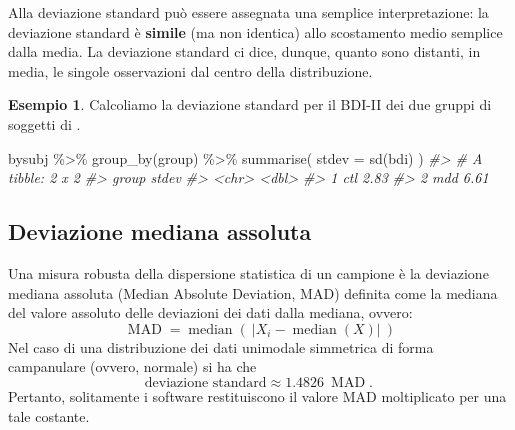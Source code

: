\documentclass[
  11pt,
  italian,
  a4paper,
  extrafontsizes,onecolumn,openright
  ]{memoir}
\newenvironment{Shaded}{\begin{snugshade}}{\end{snugshade}}
\newcommand{\AttributeTok}[1]{\textcolor[rgb]{0.77,0.63,0.00}{#1}}
\newcommand{\CommentTok}[1]{\textcolor[rgb]{0.56,0.35,0.01}{\textit{#1}}}
\newcommand{\FunctionTok}[1]{\textcolor[rgb]{0.00,0.00,0.00}{#1}}
\newcommand{\NormalTok}[1]{#1}
\newcommand{\SpecialCharTok}[1]{\textcolor[rgb]{0.00,0.00,0.00}{#1}}
\theoremstyle{definition}
\theoremstyle{definition}
\newtheorem{example}{Esempio}[chapter]
\theoremstyle{definition}
\theoremstyle{definition}
\theoremstyle{remark}
\begin{document}
Alla deviazione standard può essere assegnata una semplice interpretazione: la deviazione standard è \textbf{simile} (ma non identica) allo scostamento medio semplice dalla media. La deviazione standard ci dice, dunque, quanto sono distanti, in media, le singole osservazioni dal centro della distribuzione.

\begin{example}

Calcoliamo la deviazione standard per il BDI-II dei due gruppi di soggetti di \textcite{zetschefuture2019}.

\begin{Shaded}
\begin{Highlighting}[]
\NormalTok{bysubj }\SpecialCharTok{\%\textgreater{}\%} 
  \FunctionTok{group\_by}\NormalTok{(group) }\SpecialCharTok{\%\textgreater{}\%} 
  \FunctionTok{summarise}\NormalTok{(}
    \AttributeTok{stdev =} \FunctionTok{sd}\NormalTok{(bdi)}
\NormalTok{  ) }
\CommentTok{\#\textgreater{} \# A tibble: 2 x 2}
\CommentTok{\#\textgreater{}   group stdev}
\CommentTok{\#\textgreater{}   \textless{}chr\textgreater{} \textless{}dbl\textgreater{}}
\CommentTok{\#\textgreater{} 1 ctl    2.83}
\CommentTok{\#\textgreater{} 2 mdd    6.61}
\end{Highlighting}
\end{Shaded}

\end{example}

\hypertarget{deviazione-mediana-assoluta}{%
\subsection{Deviazione mediana assoluta}\label{deviazione-mediana-assoluta}}

Una misura robusta della dispersione statistica di un campione è la deviazione mediana assoluta (Median Absolute Deviation, MAD) definita come la mediana del valore assoluto delle deviazioni dei dati dalla mediana, ovvero:
\[
{\displaystyle \operatorname {MAD} =\operatorname {median} \left(\ \left|X_{i}-\operatorname {median} (X)\right|\ \right)}
\]
Nel caso di una distribuzione dei dati unimodale simmetrica di forma campanulare (ovvero, normale) si ha che
\[
{\displaystyle \text{deviazione standard} \approx 1.4826\ \operatorname {MAD} .\,}
\]
Pertanto, solitamente i software restituiscono il valore MAD moltiplicato per una tale costante.
\end{document}
